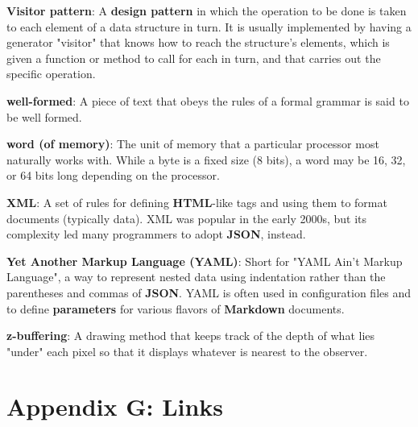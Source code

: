 \documentclass{scrbook}
\newcommand{\glosskey}[1]{\textbf{#1}}
\begin{document}
\noindent \textbf{\glosskey{Visitor pattern}}: 
A \glosskey{design pattern} in which the operation to be done is taken to each element of a data structure in turn. It is usually implemented by having a generator "visitor" that knows how to reach the structure's elements, which is given a function or method to call for each in turn, and that carries out the specific operation.


\noindent \textbf{\glosskey{well-formed}}: 
A piece of text that obeys the rules of a formal grammar is said to be well formed.


\noindent \textbf{\glosskey{word (of memory)}}: 
The unit of memory that a particular processor most naturally works with. While a byte is a fixed size (8 bits), a word may be 16, 32, or 64 bits long depending on the processor.


\noindent \textbf{\glosskey{XML}}: 
A set of rules for defining \glosskey{HTML}-like tags and using them to format documents (typically data). XML was popular in the early 2000s, but its complexity led many programmers to adopt \glosskey{JSON}, instead.


\noindent \textbf{\glosskey{Yet Another Markup Language} (YAML)}: 
Short for "YAML Ain't Markup Language", a way to represent nested data using indentation rather than the parentheses and commas of \glosskey{JSON}. YAML is often used in configuration files and to define \glosskey{parameters} for various flavors of \glosskey{Markdown} documents.


\noindent \textbf{\glosskey{z-buffering}}: 
A drawing method that keeps track of the depth of what lies "under" each pixel so that it displays whatever is nearest to the observer.




\chapter{Appendix G: Links}\label{links}
\end{document}
